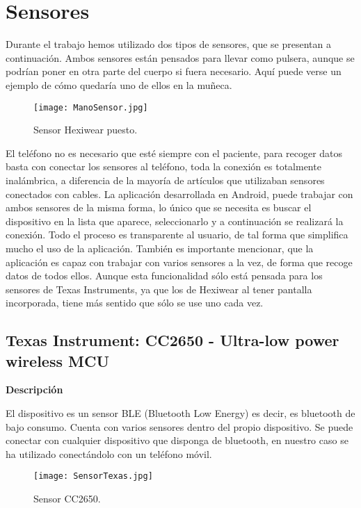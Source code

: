 \documentclass[11pt,spanish]{article}
\begin{document}
\section{Sensores}
Durante el trabajo hemos utilizado dos tipos de sensores, que se presentan a continuación. Ambos sensores están pensados para llevar como pulsera, aunque se podrían poner en otra parte del cuerpo si fuera necesario. Aquí puede verse un ejemplo de cómo quedaría uno de ellos en la muñeca.
\begin{figure}[h!]
  \centering
  \texttt{[image: ManoSensor.jpg]}
  \caption{Sensor Hexiwear puesto.}
\end{figure}

El teléfono no es necesario que esté siempre con el paciente, para recoger datos basta con conectar los sensores al teléfono, toda la conexión es totalmente inalámbrica, a diferencia de la mayoría de artículos que utilizaban sensores conectados con cables. La aplicación desarrollada en Android, puede trabajar con ambos sensores de la misma forma, lo único que se necesita es buscar el dispositivo en la lista que aparece, seleccionarlo y a continuación se realizará la conexión. Todo el proceso es transparente al usuario, de tal forma que simplifica mucho el uso de la aplicación. También es importante mencionar, que la aplicación es capaz con trabajar con varios sensores a la vez, de forma que recoge datos de todos ellos. Aunque esta funcionalidad sólo está pensada para los sensores de Texas Instruments, ya que los de Hexiwear al tener pantalla incorporada, tiene más sentido que sólo se use uno cada vez.
\newline

\subsection{Texas Instrument: CC2650 - Ultra-low power wireless MCU}
{\bf Descripción}
\newline

El dispositivo es un sensor BLE (Bluetooth Low Energy) es decir, es bluetooth de bajo consumo. Cuenta con varios sensores dentro del propio dispositivo. Se puede conectar con cualquier dispositivo que disponga de bluetooth, en nuestro caso se ha utilizado conectándolo con un teléfono móvil. 

\begin{figure}[h!]
  \centering
  \texttt{[image: SensorTexas.jpg]}
  \caption{Sensor CC2650.}
\end{figure}
\end{document}
